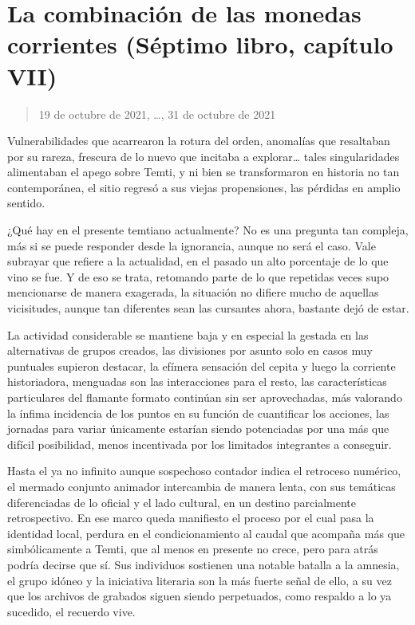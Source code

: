 \documentclass[
]{book}
\begin{document}
\hypertarget{la-combinaciuxf3n-de-las-monedas-corrientes-suxe9ptimo-libro-capuxedtulo-vii}{%
\section{La combinación de las monedas corrientes (Séptimo libro, capítulo VII)}\label{la-combinaciuxf3n-de-las-monedas-corrientes-suxe9ptimo-libro-capuxedtulo-vii}}

\begin{quote}
19 de octubre de 2021, \ldots, 31 de octubre de 2021
\end{quote}

Vulnerabilidades que acarrearon la rotura del orden, anomalías que resaltaban por su rareza, frescura de lo nuevo que incitaba a explorar\ldots{} tales singularidades alimentaban el apego sobre Temti, y ni bien se transformaron en historia no tan contemporánea, el sitio regresó a sus viejas propensiones, las pérdidas en amplio sentido.

¿Qué hay en el presente temtiano actualmente? No es una pregunta tan compleja, más si se puede responder desde la ignorancia, aunque no será el caso. Vale subrayar que refiere a la actualidad, en el pasado un alto porcentaje de lo que vino se fue. Y de eso se trata, retomando parte de lo que repetidas veces supo mencionarse de manera exagerada, la situación no difiere mucho de aquellas vicisitudes, aunque tan diferentes sean las cursantes ahora, bastante dejó de estar.

La actividad considerable se mantiene baja y en especial la gestada en las alternativas de grupos creados, las divisiones por asunto solo en casos muy puntuales supieron destacar, la efímera sensación del cepita y luego la corriente historiadora, menguadas son las interacciones para el resto, las características particulares del flamante formato continúan sin ser aprovechadas, más valorando la ínfima incidencia de los puntos en su función de cuantificar los acciones, las jornadas para variar únicamente estarían siendo potenciadas por una más que difícil posibilidad, menos incentivada por los limitados integrantes a conseguir.

Hasta el ya no infinito aunque sospechoso contador indica el retroceso numérico, el mermado conjunto animador intercambia de manera lenta, con sus temáticas diferenciadas de lo oficial y el lado cultural, en un destino parcialmente retrospectivo. En ese marco queda manifiesto el proceso por el cual pasa la identidad local, perdura en el condicionamiento al caudal que acompaña más que simbólicamente a Temti, que al menos en presente no crece, pero para atrás podría decirse que sí. Sus individuos sostienen una notable batalla a la amnesia, el grupo idóneo y la iniciativa literaria son la más fuerte señal de ello, a su vez que los archivos de grabados siguen siendo perpetuados, como respaldo a lo ya sucedido, el recuerdo vive.
\end{document}
